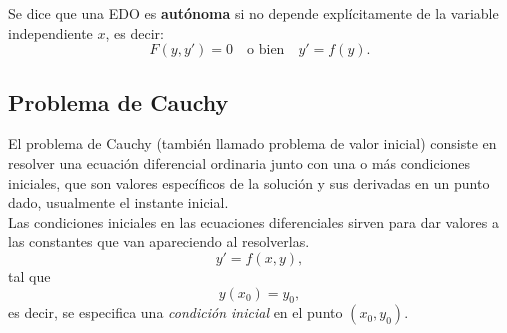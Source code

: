 Se dice que una EDO es \textbf{autónoma} si no depende explícitamente de la variable independiente $x$, 
es decir:
\[
    F(y, y') = 0 \quad \text{o bien} \quad y' = f(y).
\]

\subsection*{Problema de Cauchy}
El problema de Cauchy (también llamado problema de valor inicial) consiste en resolver una ecuación diferencial ordinaria junto con una o más condiciones iniciales, que son valores específicos de la solución y sus derivadas en un punto dado, usualmente el instante inicial.\\

Las condiciones iniciales en las ecuaciones diferenciales sirven para dar valores a las constantes que van apareciendo al resolverlas.
\[
    y' = f(x,y),
\]
tal que 
\[
    y(x_0) = y_0,
\]
es decir, se especifica una \textit{condición inicial} en el punto $(x_0,y_0)$.

